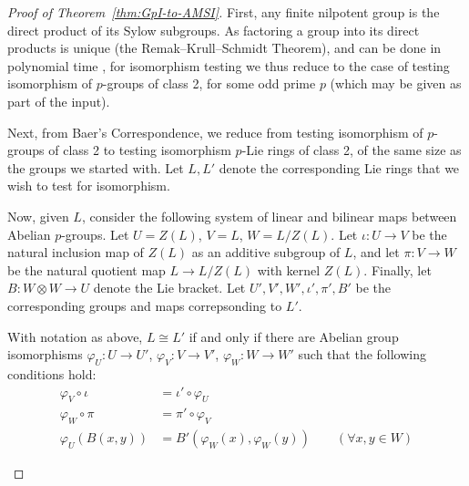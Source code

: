 \begin{proof}[Proof of Theorem~\ref{thm:GpI-to-AMSI}]
First, any finite nilpotent group is the direct product of its Sylow subgroups. As factoring a group into its direct products is unique (the Remak--Krull--Schmidt Theorem), and can be done in polynomial time \cite{WilsonProductsI, WilsonProductsII,KN}, for isomorphism testing we thus reduce to the case of testing isomorphism of $p$-groups of class 2, for some odd prime $p$ (which may be given as part of the input).

Next, from Baer's Correspondence, we reduce from testing isomorphism of $p$-groups of class 2 to testing isomorphism $p$-Lie rings of class 2, of the same size as the groups we started with. Let $L,L'$ denote the corresponding Lie rings that we wish to test for isomorphism.

Now, given $L$, consider the following system of linear and bilinear maps between Abelian $p$-groups. Let $U = Z(L)$, $V = L$, $W = L/Z(L)$. Let $\iota \colon U \to V$ be the natural inclusion map of $Z(L)$ as an additive subgroup of $L$, and let $\pi \colon V \to W$ be the natural quotient map $L \to L/Z(L)$ with kernel $Z(L)$. Finally, let $B \colon W \otimes W \to U$ denote the Lie bracket. Let $U',V',W',\iota', \pi', B'$ be the corresponding groups and maps correpsonding to $L'$. 


\begin{lemma} \label{lem:iso-Lie-ring}
With notation as above, $L \cong L'$ if and only if there are Abelian group isomorphisms $\varphi_U \colon U \to U'$, $\varphi_V \colon V \to V'$, $\varphi_W \colon W \to W'$ such that the following conditions hold:
\begin{align} 
\varphi_V \circ \iota & = \iota' \circ \varphi_U \label{eqn:iso-condition-inj} \\
\varphi_W \circ \pi & = \pi' \circ \varphi_V \label{eqn:iso-condition-surj} \\
\varphi_U(B(x,y)) & = B'(\varphi_W(x), \varphi_W(y)) \qquad (\forall x,y \in W) \label{eqn:iso-condition-bracket}
\end{align}
\end{lemma}


\end{proof}
